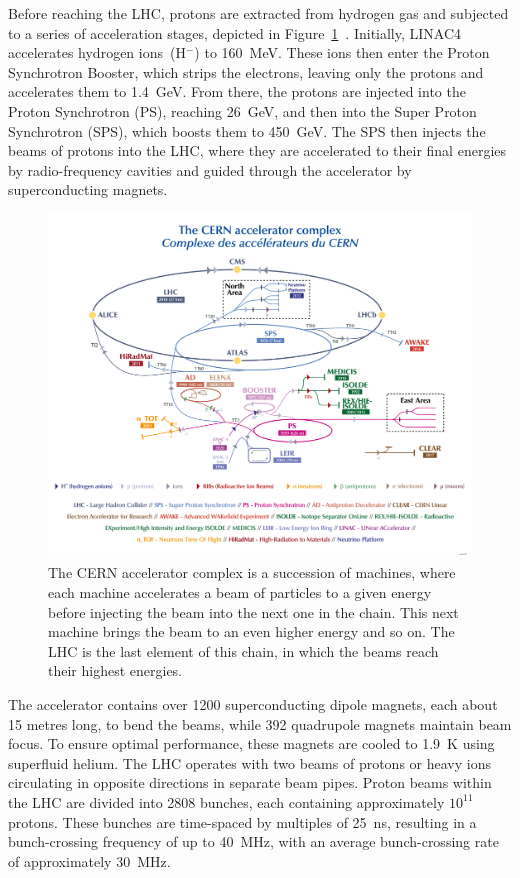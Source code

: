 Before reaching the LHC, protons are extracted from hydrogen gas and subjected to a series of acceleration stages, depicted in Figure~\ref{fig:LHC_scheme}~\cite{Lopienska:2800984}. Initially, LINAC4 accelerates hydrogen ions~(H$^-$) to \SI{160}{\mega\eV}. These ions then enter the Proton Synchrotron Booster, which strips the electrons, leaving only the protons and accelerates them to \SI{1.4}{\giga\eV}. From there, the protons are injected into the Proton Synchrotron (PS), reaching \SI{26}{\giga\eV}, and then into the Super Proton Synchrotron (SPS), which boosts them to \SI{450}{\giga\eV}. The SPS then injects the beams of protons into the LHC, where they are accelerated to their final energies by radio-frequency cavities and guided through the accelerator by superconducting magnets.
\begin{figure}[ht]
    \centering
    \includegraphics[width=\textwidth]{figures/CCC-v2022-large.png}
    \caption{The CERN accelerator complex is a succession of machines, where each machine accelerates a beam of particles to a given energy before injecting the beam into the next one in the chain. This next machine brings the beam to an even higher energy and so on. The LHC is the last element of this chain, in which the beams reach their highest energies.}
    \label{fig:LHC_scheme}
\end{figure}
The accelerator contains over 1200 superconducting dipole magnets, each about 15 metres long, to bend the beams, while 392 quadrupole magnets maintain beam focus. To ensure optimal performance, these magnets are cooled to \SI{1.9}{\kelvin} using superfluid helium. The LHC operates with two beams of protons or heavy ions circulating in opposite directions in separate beam pipes. Proton beams within the LHC are divided into 2808 bunches, each containing approximately $10^{11}$ protons. These bunches are time-spaced by multiples of \SI{25}{\nano\second}, resulting in a bunch-crossing frequency of up to \SI{40}{\mega\hertz}, with an average bunch-crossing rate of approximately \SI{30}{\mega\hertz}. 
